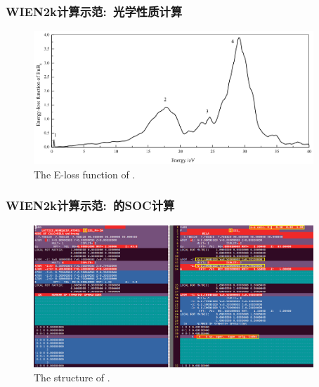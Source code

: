 \frame
{
	\frametitle{\textrm{WIEN2k}计算示范:~光学性质计算}
\vspace*{-5pt}
\begin{figure}[h!]
\centering
\includegraphics[width=4.15in]{Figures/WIEN2k_EuB6-eloss.png}
\caption{\tiny \textrm{The E-loss function of .}}%
\label{Fig:WIEN2k_EuB6-eloss}
\end{figure}
}

\frame
{
	\frametitle{\textrm{WIEN2k}计算示范:~的\textrm{SOC}计算}
\vspace*{-5pt}
\begin{figure}[h!]
\centering
\includegraphics[width=4.15in]{Figures/WIEN2k_EuB6-struct-so.png}
\caption{\tiny \textrm{The structure of .}}%
\label{Fig:WIEN2k_SOC-struct}
\end{figure}
}

